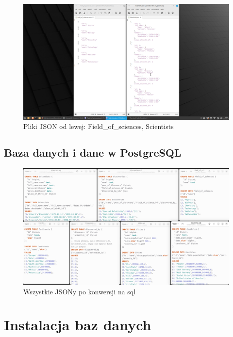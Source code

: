 \documentclass[11pt]{article}
\begin{document}
\newpage
		\begin{figure}[!ht]
			\includegraphics[width=\textwidth]{JSON_examples_2.png}
			\caption{Pliki JSON od lewej: Field\_of\_sciences, Scientists}
		\end{figure}
	\subsection{Baza danych i dane w PostgreSQL}
		\begin{figure}[!ht]
			\includegraphics[width=\textwidth]{sqlki.png}
			\caption{Wszystkie JSONy po konwersji na sql}
		\end{figure}

\newpage
\section{Instalacja baz danych}
\end{document}

